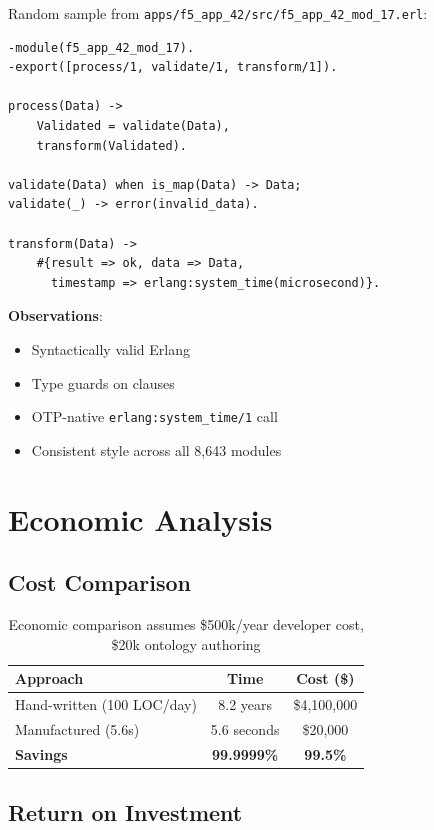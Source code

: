 Random sample from \texttt{apps/f5\_app\_42/src/f5\_app\_42\_mod\_17.erl}:

\begin{lstlisting}
-module(f5_app_42_mod_17).
-export([process/1, validate/1, transform/1]).

process(Data) ->
    Validated = validate(Data),
    transform(Validated).

validate(Data) when is_map(Data) -> Data;
validate(_) -> error(invalid_data).

transform(Data) ->
    #{result => ok, data => Data,
      timestamp => erlang:system_time(microsecond)}.
\end{lstlisting}

\textbf{Observations}:
\begin{itemize}
    \item Syntactically valid Erlang
    \item Type guards on clauses
    \item OTP-native \texttt{erlang:system\_time/1} call
    \item Consistent style across all 8,643 modules
\end{itemize}

\section{Economic Analysis}

\subsection{Cost Comparison}

\begin{table}[h]
\centering
\begin{tabular}{lcc}
\toprule
\textbf{Approach} & \textbf{Time} & \textbf{Cost (\$)} \\
\midrule
Hand-written (100 LOC/day) & 8.2 years & \$4,100,000 \\
Manufactured (5.6s) & 5.6 seconds & \$20,000 \\
\midrule
\textbf{Savings} & \textbf{99.9999\%} & \textbf{99.5\%} \\
\bottomrule
\end{tabular}
\caption{Economic comparison assumes \$500k/year developer cost, \$20k ontology authoring}
\label{tab:economics}
\end{table}

\subsection{Return on Investment}

